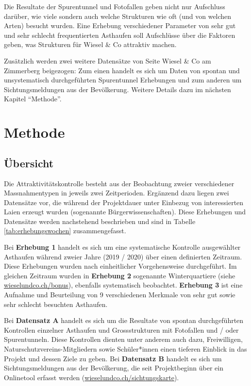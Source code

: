 \documentclass[
  oneside]{scrbook}
\begin{document}
Die Resultate der Spurentunnel und Fotofallen geben nicht nur Aufschluss darüber, wie viele sondern auch welche Strukturen wie oft (und von welchen Arten) besucht wurden. Eine Erhebung verschiedener Parameter von sehr gut und sehr schlecht frequentierten Asthaufen soll Aufschlüsse über die Faktoren geben, was Strukturen für Wiesel \& Co attraktiv machen.

Zusätzlich werden zwei weitere Datensätze von Seite Wiesel \& Co am Zimmerberg beigezogen: Zum einen handelt es sich um Daten von spontan und unsystematisch durchgeführten Spurentunnel Erhebungen und zum anderen um Sichtungsmeldungen aus der Bevölkerung. Weitere Details dazu im nächsten Kapitel ``Methode''.

\hypertarget{methode}{%
\chapter{Methode}\label{methode}}

\hypertarget{uxfcbersicht}{%
\section{Übersicht}\label{uxfcbersicht}}

Die Attraktivitätskontrolle besteht aus der Beobachtung zweier verschiedener Massnahmentypen in jeweils zwei Zeitperioden. Ergänzend dazu liegen zwei Datensätze vor, die während der Projektdauer unter Einbezug von interessierten Laien erzeugt wurden (sogenannte Bürgerwissenschaften). Diese Erhebungen und Datensätze werden nachstehend beschrieben und sind in Tabelle \ref{tab:erhebungswochen} zusammengefasst.

Bei \textbf{Erhebung 1} handelt es sich um eine systematische Kontrolle ausgewählter Asthaufen während zweier Jahre (2019 / 2020) über einen definierten Zeitraum. Diese Erhebungen wurden nach einheitlicher Vorgehensweise durchgeführt. Im gleichen Zeitraum wurden in \textbf{Erhebung 2} sogenannte Winterquartiere (siehe \href{http://www.wieselundco.ch/bonus}{wieselundco.ch/bonus}), ebenfalls systematisch beobachtet. \textbf{Erhebung 3} ist eine Aufnahme und Beurteilung von 9 verschiedenen Merkmale von sehr gut sowie sehr schlecht besuchten Asthaufen.

Bei \textbf{Datensatz A} handelt es sich um die Resultate von spontan durchgeführten Kontrollen einzelner Asthaufen und Grossstrukturen mit Fotofallen und / oder Spurentunneln. Diese Kontrollen dienten unter anderem auch dazu, Freiwilligen, Naturschutzvereins-Mitgliedern sowie Schüler*innen einen tieferen Einblick in das Projekt und dessen Ziele zu geben. Bei \textbf{Datensatz B} handelt es sich um Sichtungsmeldungen aus der Bevölkerung, die seit Projektbeginn über ein Onlinetool erfasst werden (\href{http://www.wieselundco.ch/beobachtung}{wieselundco.ch/sichtungskarte}).
\end{document}

